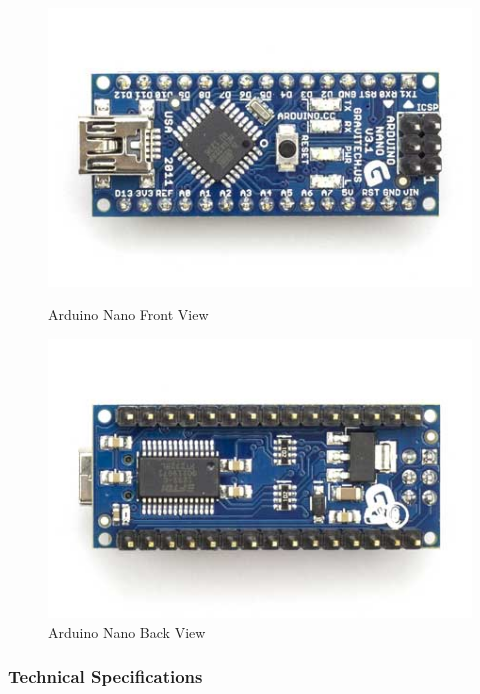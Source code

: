 \documentclass[14pt,a4paper]{extarticle}
\begin{document}
			\begin{figure}[H]
	\centering
	\begin{minipage}[b]{0.45\linewidth}
		\includegraphics[width=\textwidth, scale=0.5]{ArduinoNanoFront_3_sm.jpg}
		\caption{Arduino Nano Front View}	
	\end{minipage}
	\quad
	\begin{minipage}[b]{0.45\linewidth}
		\includegraphics[width=\textwidth, scale=0.5]{ArduinoNanoBack_3_sm.jpg}
		\caption{Arduino Nano Back View}
	
	\end{minipage}
	\end{figure}
	
	

	\subsubsection{Technical Specifications}
	
\end{document}

